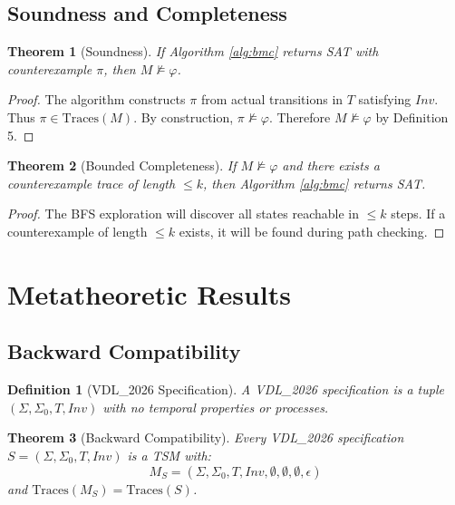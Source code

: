 \documentclass[conference]{IEEEtran}
\newtheorem{theorem}{Theorem}
\newtheorem{definition}{Definition}
\begin{document}
\subsection{Soundness and Completeness}

\begin{theorem}[Soundness]
\label{thm:soundness}
If Algorithm \ref{alg:bmc} returns SAT with counterexample $\pi$, then $M \not\models \varphi$.
\end{theorem}

\begin{proof}
The algorithm constructs $\pi$ from actual transitions in $T$ satisfying $Inv$. Thus $\pi \in \text{Traces}(M)$. By construction, $\pi \not\models \varphi$. Therefore $M \not\models \varphi$ by Definition 5.
\end{proof}

\begin{theorem}[Bounded Completeness]
\label{thm:completeness}
If $M \not\models \varphi$ and there exists a counterexample trace of length $\leq k$, then Algorithm \ref{alg:bmc} returns SAT.
\end{theorem}

\begin{proof}
The BFS exploration will discover all states reachable in $\leq k$ steps. If a counterexample of length $\leq k$ exists, it will be found during path checking.
\end{proof}

\section{Metatheoretic Results}

\subsection{Backward Compatibility}

\begin{definition}[VDL\_2026 Specification]
A VDL\_2026 specification is a tuple $(Σ, Σ_0, T, Inv)$ with no temporal properties or processes.
\end{definition}

\begin{theorem}[Backward Compatibility]
\label{thm:compatibility}
Every VDL\_2026 specification $S = (\Sigma, \Sigma_0, T, Inv)$ is a TSM with:
\begin{equation}
M_S = (\Sigma, \Sigma_0, T, Inv, \emptyset, \emptyset, \emptyset, \epsilon)
\end{equation}
and $\text{Traces}(M_S) = \text{Traces}(S)$.
\end{theorem}
\end{document}

